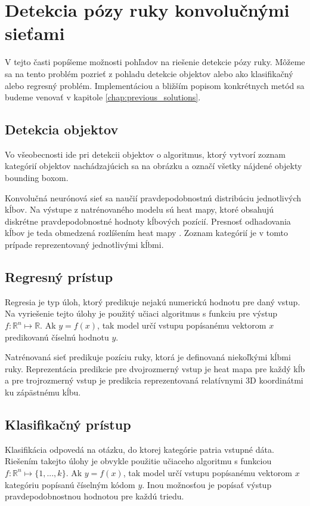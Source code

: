 \section{Detekcia pózy ruky konvolučnými sieťami}
V tejto časti popíšeme možnosti pohľadov na riešenie detekcie pózy ruky. Môžeme sa na tento problém pozrieť z pohladu detekcie objektov alebo ako klasifikačný alebo regresný problém. Implementáciou a bližším popisom konkrétnych metód sa budeme venovať v kapitole \ref{chap:previous_solutions}.
\subsection{Detekcia objektov}
Vo všeobecnosti ide pri detekcii objektov o algoritmus, ktorý vytvorí zoznam kategórií objektov nachádzajúcich sa na obrázku a označí všetky nájdené objekty bounding boxom. \cite{Russakovsky2015}

Konvolučná neurónová sieť sa naučií pravdepodobnostnú distribúciu jednotlivých kĺbov. Na výstupe z natrénovaného modelu  sú heat mapy, ktoré obsahujú diskrétne pravdepodobnostné hodnoty kĺbových pozícií. Presnosť odhadovania kĺbov je teda obmedzená rozlíšením heat mapy \cite{Wu18HandPose}. Zoznam kategórií je v tomto prípade reprezentovaný jednotlivými kĺbmi.

\subsection{Regresný prístup}\label{subchapt:regression_approach}
Regresia je typ úloh, ktorý predikuje nejakú numerickú hodnotu pre daný vstup. Na vyriešenie tejto úlohy je použitý učiaci algoritmus s funkciu pre výstup $f: \mathbb{R}^n \mapsto \mathbb{R}$. Ak $y = f(x)$, tak model určí vstupu popísanému vektorom $x$ predikovanú číselnú hodnotu $y$. \cite{Goodfellow-et-al-2016}

Natrénovaná sieť predikuje pozíciu ruky, ktorá je definovaná niekoľkými kĺbmi ruky. Reprezentácia predikcie pre dvojrozmerný vstup je heat mapa pre každý kĺb a pre trojrozmerný vstup je predikcia reprezentovaná relatívnymi 3D koordinátmi ku zápästnému kĺbu. \cite{GANeratedHands_CVPR2018}

\subsection{Klasifikačný prístup}
Klasifikácia odpovedá na otázku, do ktorej kategórie patria vstupné dáta. Riešením takejto úlohy je obvykle použitie učiaceho algoritmu s funkciou $f: \mathbb{R}^n \mapsto \{1, ..., k\}$. Ak $y = f(x)$, tak model určí vstupu popísanému vektorom $x$ kategóriu popísanú číselným kódom $y$. Inou možnosťou je popísať výstup pravdepodobnostnou hodnotou pre každú triedu. \cite{Goodfellow-et-al-2016}

